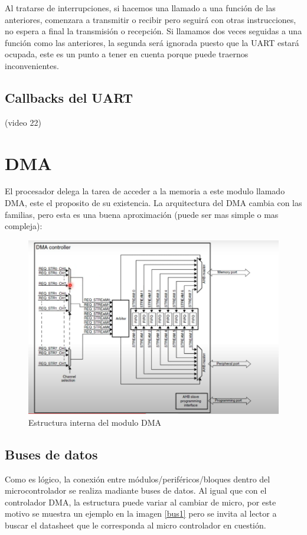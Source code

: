 \documentclass[a4paper,12pt]{report} %
\begin{document}
Al tratarse de interrupciones, si hacemos una llamado a una función de las anteriores, comenzara a transmitir o recibir pero seguirá con otras instrucciones, no espera a final la transmisión o recepción.
Si llamamos dos veces seguidas a una función como las anteriores, la segunda será ignorada puesto que la UART estará ocupada, este es un punto a tener en cuenta porque puede traernos inconvenientes.


\subsection{Callbacks del UART}

(video 22)

\section{DMA}

El procesador delega la tarea de acceder a la memoria a este modulo llamado DMA, este el proposito de su existencia. La arquitectura del DMA cambia con las familias, pero esta es una buena aproximación (puede ser mas simple o mas compleja):


\begin{figure}[H]
	\centering
	\includegraphics[scale=0.5]{Imagenes/stm/dma}
	\caption{Estructura interna del modulo DMA}
	\label{dma}
\end{figure}


\subsection{Buses de datos}

Como es lógico, la conexión entre módulos/periféricos/bloques dentro del microcontrolador se realiza madiante buses de datos. Al igual que con el controlador DMA, la estructura puede variar al cambiar de micro, por este motivo se muestra un ejemplo en la imagen \ref{bus1} pero se invita al lector a buscar el datasheet que le corresponda al micro controlador en cuestión.
\end{document}

